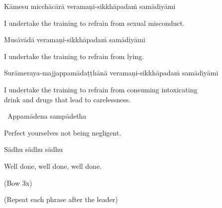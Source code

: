 Kāmesu micchācārā veramaṇi-sikkhāpadaṁ samādiyāmi

\begin{english}
  I undertake the training to refrain from sexual misconduct.
\end{english}

Musāvādā veramaṇi-sikkhāpadaṁ samādiyāmi

\begin{english}
  I undertake the training to refrain from lying.
\end{english}

\begin{pali-hang}
  Surāmeraya-majjappamādaṭṭhānā veramaṇi-sikkhāpadaṁ samādiyāmi
\end{pali-hang}

\begin{english-hang}
  I undertake the training to refrain from consuming intoxicating\\
  drink and drugs that lead to carelessness.\makeatletter\hyperlink{endnote140-appendix}\makeatother
\end{english-hang}


\begin{leader-only}
  \anglebracketleft\ \hspace{-0.5mm}Appamādena sampādetha \hspace{-0.5mm}\anglebracketright\
\end{leader-only}

\begin{english}
  Perfect yourselves not being negligent.
\end{english}

Sādhu sādhu sādhu

\begin{english}
  Well done, well done, well done.
\end{english}

\begin{center}
  (Bow 3x)
\end{center}

\clearpage

\begin{center}
  \textbf{}
\end{center}

\begin{center}
  (Repeat each phrase after the leader)
\end{center}

